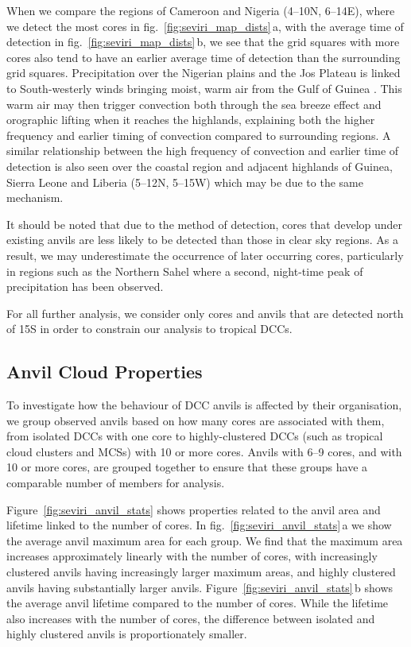 \documentclass[acp, manuscript]{copernicus}
\begin{document}
When we compare the regions of Cameroon and Nigeria (4--10\textdegree N, 6--14\textdegree E), where we detect the most cores in fig.~\ref{fig:seviri_map_dists}\,a, with the average time of detection in fig.~\ref{fig:seviri_map_dists}\,b, we see that the grid squares with more cores also tend to have an earlier average time of detection than the surrounding grid squares. 
Precipitation over the Nigerian plains and the Jos Plateau is linked to South-westerly winds bringing moist, warm air from the Gulf of Guinea \citep{vondou_seasonal_2010}. 
This warm air may then trigger convection both through the sea breeze effect and orographic lifting when it reaches the highlands, explaining both the higher frequency and earlier timing of convection compared to surrounding regions. 
A similar relationship between the high frequency of convection and earlier time of detection is also seen over the coastal region and adjacent highlands of Guinea, Sierra Leone and Liberia (5--12\textdegree N, 5--15\textdegree W) which may be due to the same mechanism.

It should be noted that due to the method of detection, cores that develop under existing anvils are less likely to be detected than those in clear sky regions. 
As a result, we may underestimate the occurrence of later occurring cores, particularly in regions such as the Northern Sahel where a second, night-time peak of precipitation has been observed.

For all further analysis, we consider only cores and anvils that are detected north of 15\textdegree S in order to constrain our analysis to tropical DCCs.

\subsection{Anvil Cloud Properties}

To investigate how the behaviour of DCC anvils is affected by their organisation, we group observed anvils based on how many cores are associated with them, from isolated DCCs with one core to highly-clustered DCCs (such as tropical cloud clusters and MCSs) with 10 or more cores. 
Anvils with 6--9 cores, and with 10 or more cores, are grouped together to ensure that these groups have a comparable number of members for analysis.

Figure~\ref{fig:seviri_anvil_stats} shows properties related to the anvil area and lifetime linked to the number of cores. 
In fig.~\ref{fig:seviri_anvil_stats}\,a we show the average anvil maximum area for each group. 
We find that the maximum area increases approximately linearly with the number of cores, with increasingly clustered anvils having increasingly larger maximum areas, and highly clustered anvils having substantially larger anvils. 
Figure~\ref{fig:seviri_anvil_stats}\,b shows the average anvil lifetime compared to the number of cores. 
While the lifetime also increases with the number of cores, the difference between isolated and highly clustered anvils is proportionately smaller.
\end{document}
